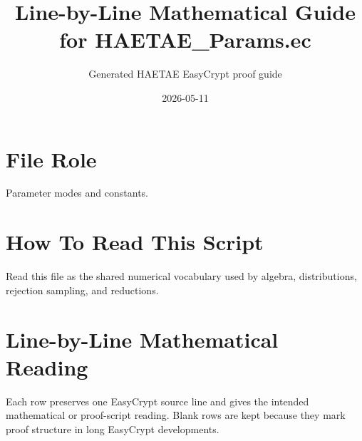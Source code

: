 \documentclass[10pt]{article}
\title{Line-by-Line Mathematical Guide for HAETAE\_Params.ec}
\author{Generated HAETAE EasyCrypt proof guide}
\date{2026-05-11}
\begin{document}
\maketitle

\section*{File Role}
Parameter modes and constants.

\section*{How To Read This Script}
Read this file as the shared numerical vocabulary used by algebra, distributions, rejection sampling, and reductions.

\section*{Line-by-Line Mathematical Reading}
Each row preserves one EasyCrypt source line and gives the intended mathematical
or proof-script reading.  Blank rows are kept because they mark proof structure
in long EasyCrypt developments.
\end{document}

